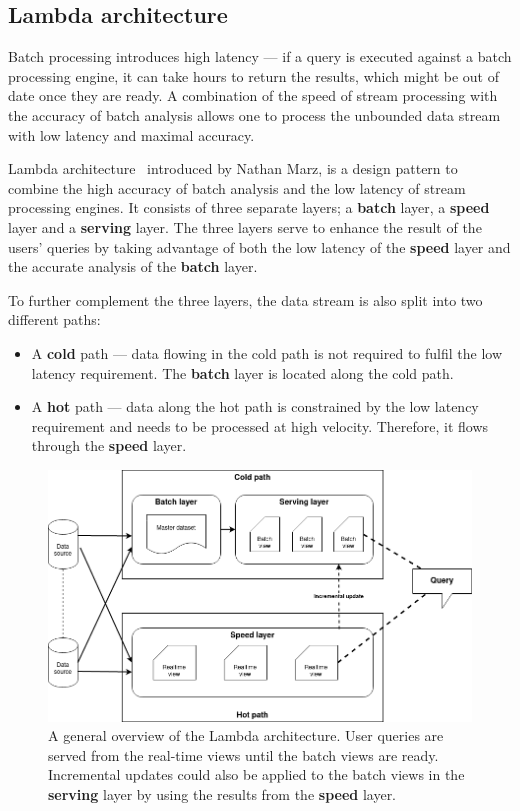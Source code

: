 \subsection{Lambda architecture}

Batch processing introduces high latency --- if a query 
is executed against a batch processing engine, it can take hours to return the results, which might be 
out of date once they are ready. A combination of the speed of stream processing with the accuracy of batch analysis
allows one to process the unbounded data stream with low latency and maximal accuracy. 

Lambda architecture~\cite{lambda_arch, lambda_arch_book, lambda_arc_bpost} introduced by Nathan Marz, is a 
design pattern to combine the high accuracy of batch analysis and the low latency of 
stream processing engines. It consists of three separate layers; a \textbf{batch} layer, 
a \textbf{speed} layer and a \textbf{serving} layer. 
The three layers serve to enhance the result of the users' queries by taking 
advantage of both the low latency of the \textbf{speed} layer and the accurate analysis of the \textbf{batch}
layer.


To further complement the three layers, 
the data stream is also split into two different paths: 
\begin{itemize}
    \item A \textbf{cold} path --- data flowing in the cold path is not required to fulfil the low
        latency requirement. The \textbf{batch} layer is located along the cold path.   
    \item A \textbf{hot} path --- data along the hot path is constrained by the low latency requirement 
        and needs to be processed at high velocity. Therefore, it flows through the 
        \textbf{speed} layer.  
\end{itemize}

\begin{figure}[!htpb]
    \centering
    \includegraphics[width=\linewidth]{fig/lambda_arch.png}
    \caption{A general overview of the Lambda architecture. User queries are served from 
    the real-time views until the batch views are ready. Incremental updates could also be applied 
to the batch views in the \textbf{serving} layer by using the results from the \textbf{speed} layer.
~\cite{lambda_arch_book}}%
    \label{fig:lambda_arch}
\end{figure}


